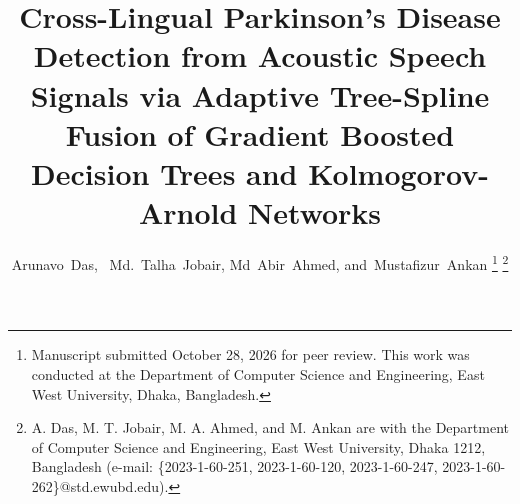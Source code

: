 \documentclass[journal,10pt,twoside]{IEEEtran}
\begin{document}
\title{Cross-Lingual Parkinson's Disease Detection from Acoustic Speech Signals via Adaptive Tree-Spline Fusion of Gradient Boosted Decision Trees and Kolmogorov-Arnold Networks}

\author{Arunavo~Das,~
        Md.~Talha~Jobair,
        Md~Abir~Ahmed,
        and~Mustafizur~Ankan%
\thanks{Manuscript submitted October 28, 2026 for peer review. This work was conducted at the Department of Computer Science and Engineering, East West University, Dhaka, Bangladesh.}%
\thanks{A. Das, M. T. Jobair, M. A. Ahmed, and M. Ankan are with the Department of Computer Science and Engineering, East West University, Dhaka 1212, Bangladesh (e-mail: \{2023-1-60-251, 2023-1-60-120, 2023-1-60-247, 2023-1-60-262\}@std.ewubd.edu).}}

\maketitle
\end{document}
